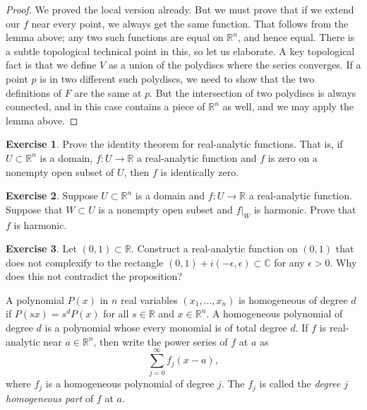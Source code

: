 \documentclass[12pt,openany]{book}
\newcommand{\C}{{\mathbb{C}}}
\newcommand{\R}{{\mathbb{R}}}
\newcommand{\myindex}[1]{#1\index{#1}}
\theoremstyle{plain}
\theoremstyle{remark}
\theoremstyle{definition}
\newenvironment{exbox}{%
    \def\FrameCommand{\vrule width 1pt \relax\hspace{10pt}}%
    \MakeFramed {\advance \hsize -\width \FrameRestore}%
}{%
    \endMakeFramed
}
\theoremstyle{exercise}
\newtheorem{exercise}{Exercise}[section]
\theoremstyle{example}
\begin{document}
\begin{proof}
We proved the local version already.  But we must prove that if we
extend our $f$ near every point, we always get the same function.
That follows from the lemma above; any two such functions are
equal on $\R^n$, and hence equal.  There is a subtle topological technical
point in this, so let us elaborate.  A key topological fact is that we define
$V$ as a union of the polydiscs where the series converges.  If
a point $p$ is in two different such polydiscs, we need to show that
the two definitions of $F$ are the same at $p$.  But the intersection
of two polydiscs is always connected, and in this case contains a piece
of $\R^n$ as well, and we may apply the lemma above.
\end{proof}

\begin{exbox}
\begin{exercise}
Prove the identity theorem for real-analytic functions.  That is, if $U
\subset \R^n$ is a domain, $f \colon U \to \R$ a real-analytic function and
$f$ is zero on a nonempty open subset of $U$, then $f$ is identically zero.
\end{exercise}

\begin{exercise}
Suppose $U \subset \R^n$ is a domain and $f \colon U \to \R$ a real-analytic
function.  Suppose that $W \subset U$ is a nonempty open subset and
$f|_W$ is harmonic.  Prove that $f$ is harmonic.
\end{exercise}

\begin{exercise}
Let $(0,1) \subset \R$.  Construct a real-analytic function
on $(0,1)$ that does not complexify to the rectangle $(0,1) + i(-\epsilon,\epsilon)
\subset \C$ for any $\epsilon > 0$.  Why does this not contradict the
proposition?
\end{exercise}
\end{exbox}

A polynomial $P(x)$ in $n$ real variables $(x_1,\ldots,x_n)$ is homogeneous of degree $d$ if
$P(s x) = s^d P(x)$ for all $s \in \R$ and $x \in \R^n$.
A homogeneous polynomial of degree $d$ is a polynomial whose
every monomial
is of total degree $d$.
If $f$ is real-analytic near $a \in \R^n$, then
write the power series of $f$ at $a$ as
\begin{equation*}
\sum_{j=0}^{\infty} f_j(x-a) ,
\end{equation*}
where $f_j$ is a homogeneous polynomial of degree $j$.  The $f_j$ is 
called the
\emph{\myindex{degree $j$ homogeneous part}} of $f$
at $a$.
\end{document}
